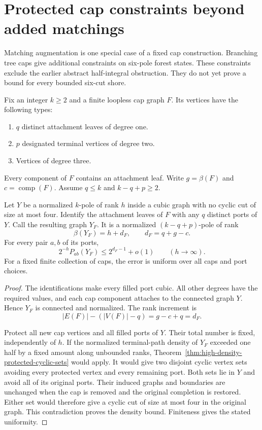 \section{Protected cap constraints beyond added matchings}
\label{sec:path-six-protected-caps}

Matching augmentation is one special case of a fixed cap construction.
Branching tree caps give additional constraints on six-pole forest states.
These constraints exclude the earlier abstract half-integral obstruction.
They do not yet prove a bound for every bounded six-cut shore.

\begin{theorem}
\label{thm:path-six-fixed-cap-density}
Fix an integer $k\ge2$ and a finite loopless cap graph $F$.
Its vertices have the following types:
\begin{enumerate}
\item $q$ distinct attachment leaves of degree one.
\item $p$ designated terminal vertices of degree two.
\item Vertices of degree three.
\end{enumerate}
Every component of $F$ contains an attachment leaf.
Write $g=\beta(F)$ and $c=\operatorname{comp}(F)$.
Assume $q\le k$ and $k-q+p\ge2$.

Let $Y$ be a normalized $k$-pole of rank $h$ inside a cubic graph with no cyclic cut of size at most four.
Identify the attachment leaves of $F$ with any $q$ distinct ports of $Y$.
Call the resulting graph $Y_F$.
It is a normalized $(k-q+p)$-pole of rank
\[
 \beta(Y_F)=h+d_F,\qquad d_F=q+g-c.
\]
For every pair $a,b$ of its ports,
\[
 2^{-h}P_{ab}(Y_F)\le2^{d_F-1}+o(1)
 \qquad(h\to\infty).
\]
For a fixed finite collection of caps, the error is uniform over all caps and port choices.
\end{theorem}

\begin{proof}
The identifications make every filled port cubic.
All other degrees have the required values, and each cap component attaches to the connected graph $Y$.
Hence $Y_F$ is connected and normalized.
The rank increment is
\[
 |E(F)|-(|V(F)|-q)=g-c+q=d_F.
\]

Protect all new cap vertices and all filled ports of $Y$.
Their total number is fixed, independently of $h$.
If the normalized terminal-path density of $Y_F$ exceeded one half by a fixed amount along unbounded ranks, Theorem~\ref{thm:high-density-protected-cyclic-sets} would apply.
It would give two disjoint cyclic vertex sets avoiding every protected vertex and every remaining port.
Both sets lie in $Y$ and avoid all of its original ports.
Their induced graphs and boundaries are unchanged when the cap is removed and the original completion is restored.
Either set would therefore give a cyclic cut of size at most four in the original graph.
This contradiction proves the density bound.
Finiteness gives the stated uniformity.
\end{proof}

